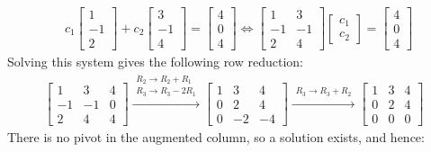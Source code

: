 \documentclass{article}
\begin{document}
\begin{itemize}
\begin{align*}
& c_1\begin{bmatrix} 1 \\ -1 \\ 2 \end{bmatrix} + c_2\begin{bmatrix} 3 \\ -1 \\ 4 \end{bmatrix} = \begin{bmatrix} 4 \\ 0 \\ 4 \end{bmatrix}   
\iff \begin{bmatrix}
1 & 3 \\ 
-1 & -1 \\ 
2 & 4 
\end{bmatrix}\begin{bmatrix}
c_1 \\ c_2 
\end{bmatrix} = \begin{bmatrix} 4 \\ 0 \\ 4 \end{bmatrix}
\end{align*}   
Solving this system gives the following row reduction:
\begin{align*}
\left[\begin{array}{cc|c}
1 & 3 & 4 \\ 
-1 & -1 & 0 \\
2 & 4 & 4
\end{array}\right] 
\xrightarrow{\begin{array}{c} R_2 \rightarrow R_2 + R_1 \\ R_3 \rightarrow R_3 - 2R_1 \end{array}}  
\left[\begin{array}{cc|c}
1 & 3 & 4 \\ 
0 & 2 & 4 \\
0 & -2 & -4
\end{array}\right] 
\xrightarrow{\begin{array}{c} R_3 \rightarrow R_3 + R_2 \end{array}}  
\left[\begin{array}{cc|c}
1 & 3 & 4 \\ 
0 & 2 & 4 \\
0 & 0 & 0
\end{array}\right] 
\end{align*}
There is no pivot in the augmented column, so a solution exists, and hence:

\end{itemize}
\end{document}
